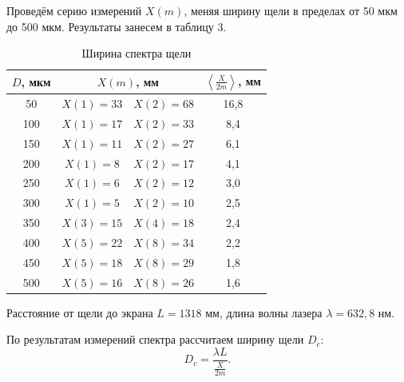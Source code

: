 \documentclass[a4paper,12pt]{article} %
\begin{document}
	
	Проведём серию измерений $X(m)$, меняя ширину щели в пределах от 50 мкм до 500 мкм. Результаты занесем в таблицу 3.
	
	\begin{table}[h!]
		\centering
		\begin{tabular}{|c|cc|c|}
			\hline
			$D$, мкм & \multicolumn{2}{c|}{$X(m)$, мм}                & $\left\langle \frac{X}{2m} \right\rangle$, мм \\ \hline
			50       & \multicolumn{1}{c|}{$X(1) = 33$} & $X(2) = 68$ & 16,8                                          \\ \hline
			100      & \multicolumn{1}{c|}{$X(1) = 17$} & $X(2) = 33$ & 8,4                                           \\ \hline
			150      & \multicolumn{1}{c|}{$X(1) = 11$} & $X(2) = 27$ & 6,1                                           \\ \hline
			200      & \multicolumn{1}{c|}{$X(1) = 8$}  & $X(2) = 17$ & 4,1                                           \\ \hline
			250      & \multicolumn{1}{c|}{$X(1) = 6$}  & $X(2) = 12$ & 3,0                                           \\ \hline
			300      & \multicolumn{1}{c|}{$X(1) = 5$}  & $X(2) = 10$ & 2,5                                           \\ \hline
			350      & \multicolumn{1}{c|}{$X(3) = 15$} & $X(4) = 18$ & 2,4                                           \\ \hline
			400      & \multicolumn{1}{c|}{$X(5) = 22$} & $X(8) = 34$ & 2,2                                           \\ \hline
			450      & \multicolumn{1}{c|}{$X(5) = 18$} & $X(8) = 29$ & 1,8                                           \\ \hline
			500      & \multicolumn{1}{c|}{$X(5) = 16$} & $X(8) = 26$ & 1,6                                           \\ \hline
		\end{tabular}
	\caption{Ширина спектра щели}
	\end{table}

	Расстояние от щели до экрана $L = 1318$ мм, длина волны лазера $\lambda = 632,8$ нм.
	
	По результатам измерений спектра рассчитаем ширину щели $D_c$:
	\begin{equation*}
		D_c = \dfrac{\lambda L}{\frac{X}{2m}}.
	\end{equation*}
\end{document}
